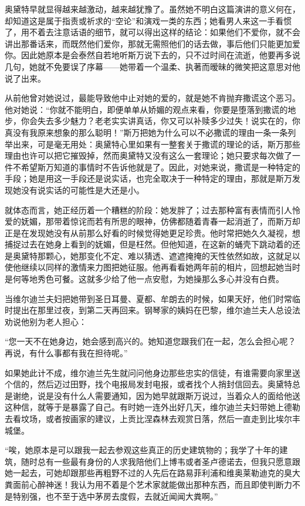 \par 奥黛特早就显得越来越激动，越来越犹豫了。虽然她不明白这篇演讲的意义何在，却知道这是属于指责或祈求的“空论”和演戏一类的东西；她看男人来这一手看惯了，用不着去注意话语的细节，就可以得出这样的结论：如果他们不爱你，就不会讲出那番话来，而既然他们爱你，那就无需照他们的话去做，事后他们只能更加爱你。因此她原本是会泰然自若地听斯万说下去的，只不过时间在流逝，他要再多说几句，她就不免要误了序幕——她带着一个温柔、执著而暧昧的微笑把这意思对他说了出来。
\par 从前他曾对她说过，最能导致他中止对她的爱的，就是她不肯抛弃撒谎这个恶习。他对她说：“你就不能明白，即便单单从娇媚的观点来看，你要是堕落到撒谎的地步，你会失去多少魅力？老老实实讲真话，你又可以补赎多少过失！说实在的，你真没有我原来想象的那么聪明！”斯万把她为什么可以不必撒谎的理由一条一条列举出来，可是毫无用处：奥黛特心里如果有一整套关于撒谎的理论的话，斯万那些理由也许可以把它摧毁掉，然而奥黛特又没有这么一套理论；她只要求每次做了一件不希望斯万知道的事情时不告诉他就是了。因此，对她来说，撒谎是一种特定的手段；她是用这一手段还是说实话，也完全取决于一种特定的理由，那就是斯万发现她没有说实话的可能性是大还是小。
\par 就体态而言，她正经历着一个糟糕的阶段：她发胖了；过去那种富有表情而引人怜爱的妩媚，那带着惊诧而若有所思的眼神，仿佛都随着青春一起消逝了，而斯万却正是在发现她没有从前那么好看的时候觉得她更足珍贵。他时常把她久久凝视，想捕捉过去在她身上看到的妩媚，但是枉然。但他知道，在这新的蛹壳下跳动着的还是奥黛特那颗心，她那变化不定、难以猜透、遮遮掩掩的天性依然如故，这就足以使他继续以同样的激情来力图把她征服。他再看看她两年前的相片，回想起她当时是何等地秀色可餐。这就多少给了他一点安慰，为她操那么多心并没有白费。
\par 当维尔迪兰夫妇把她带到圣日耳曼、夏都、牟朗去的时候，如果天好，他们时常临时提出在那里过夜，到第二天再回来。钢琴家的姨妈在巴黎，维尔迪兰夫人总设法劝说他别为老人担心：
\par “您一天不在她身边，她会感到高兴的。她知道您跟我们在一起，怎么会担心呢？再说，有什么事都有我在担待呢。”
\par 如果她此计不成，维尔迪兰先生就问问他身边那些忠实的信徒，有谁需要向家里送个信的，然后迈过田野，找个电报局发封电报，或者找个人捎封信回去。奥黛特总是谢绝，说是没有什么人需要通知，因为她早就跟斯万说过，当着众人的面给他送这种信，就等于是暴露了自己。有时她一连外出好几天，维尔迪兰夫妇带她上德勒去看坟场，或者按画家的建议，上贡比涅森林去观赏日落，然后一直走到比埃尔丰城堡。
\par “唉，她原本是可以跟我一起去参观这些真正的历史建筑物的；我学了十年的建筑，随时总有一些最有身份的人求我陪他们上博韦或者圣卢德诺去，但我只愿意跟她一起去，可她却跟那些再粗野不过的人先后在路易菲利浦和维奥莱勒迪克的臭大粪面前心醉神迷！我认为用不着是个艺术家就能做出那种东西，而且即使判断力不是特别强，也不至于选中茅房去度假，去就近闻闻大粪啊。”
